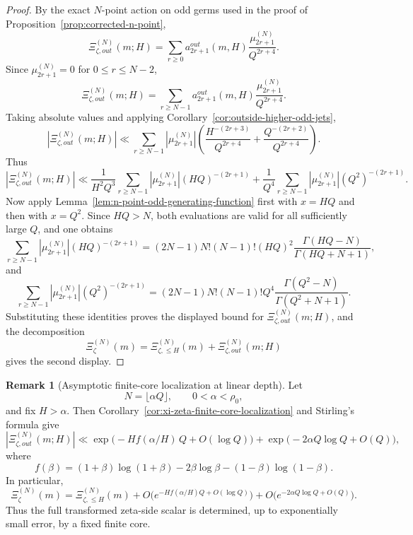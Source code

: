 \documentclass[11pt,a4paper]{amsart}
\def\out{out}%
\theoremstyle{plain}
\theoremstyle{definition}
\newtheorem{remark}[theorem]{Remark}
\newcommand{\out}{\mathrm{out}}
\begin{document}
\begin{proof}
By the exact $N$-point action on odd germs used in the proof of
Proposition~\ref{prop:corrected-n-point},
\[
\Xi_{\zeta,\out}^{(N)}(m;H)
=
\sum_{r\ge 0} a_{2r+1}^{\out}(m,H)\frac{\mu_{2r+1}^{(N)}}{Q^{2r+4}}.
\]
Since $\mu_{2r+1}^{(N)}=0$ for $0\le r\le N-2$,
\[
\Xi_{\zeta,\out}^{(N)}(m;H)
=
\sum_{r\ge N-1} a_{2r+1}^{\out}(m,H)\frac{\mu_{2r+1}^{(N)}}{Q^{2r+4}}.
\]
Taking absolute values and applying
Corollary~\ref{cor:outside-higher-odd-jets},
\[
|\Xi_{\zeta,\out}^{(N)}(m;H)|
\ll
\sum_{r\ge N-1}
|\mu_{2r+1}^{(N)}|
\left(
\frac{H^{-(2r+3)}}{Q^{2r+4}}
+
\frac{Q^{-(2r+2)}}{Q^{2r+4}}
\right).
\]
Thus
\[
|\Xi_{\zeta,\out}^{(N)}(m;H)|
\ll
\frac{1}{H^2Q^3}
\sum_{r\ge N-1}
|\mu_{2r+1}^{(N)}|(HQ)^{-(2r+1)}
+
\frac{1}{Q^4}
\sum_{r\ge N-1}
|\mu_{2r+1}^{(N)}|(Q^2)^{-(2r+1)}.
\]
Now apply Lemma~\ref{lem:n-point-odd-generating-function} first with
$x=HQ$ and then with $x=Q^2$. Since $HQ>N$, both evaluations are valid
for all sufficiently large $Q$, and one obtains
\[
\sum_{r\ge N-1}
|\mu_{2r+1}^{(N)}|(HQ)^{-(2r+1)}
=
(2N-1)N!(N-1)!(HQ)^2
\frac{\Gamma(HQ-N)}{\Gamma(HQ+N+1)},
\]
and
\[
\sum_{r\ge N-1}
|\mu_{2r+1}^{(N)}|(Q^2)^{-(2r+1)}
=
(2N-1)N!(N-1)!Q^4
\frac{\Gamma(Q^2-N)}{\Gamma(Q^2+N+1)}.
\]
Substituting these identities proves the displayed bound for
$\Xi_{\zeta,\out}^{(N)}(m;H)$, and the decomposition
\[
\Xi_\zeta^{(N)}(m)=\Xi_{\zeta,\le H}^{(N)}(m)+\Xi_{\zeta,\out}^{(N)}(m;H)
\]
gives the second display.
\end{proof}

\begin{remark}[Asymptotic finite-core localization at linear depth]
\label{rem:xi-zeta-finite-core-localization-asymptotic}
Let
\[
N=\lfloor \alpha Q\rfloor,
\qquad
0<\alpha<\rho_0,
\]
and fix $H>\alpha$. Then Corollary~\ref{cor:xi-zeta-finite-core-localization}
and Stirling's formula give
\[
|\Xi_{\zeta,\out}^{(N)}(m;H)|
\ll
\exp\!\bigl(-H f(\alpha/H)\,Q+O(\log Q)\bigr)
+
\exp\!\bigl(-2\alpha Q\log Q+O(Q)\bigr),
\]
where
\[
f(\beta)
=
(1+\beta)\log(1+\beta)-2\beta\log\beta-(1-\beta)\log(1-\beta).
\]
In particular,
\[
\Xi_\zeta^{(N)}(m)
=
\Xi_{\zeta,\le H}^{(N)}(m)
+
O\!\bigl(e^{-Hf(\alpha/H)Q+O(\log Q)}\bigr)
+
O\!\bigl(e^{-2\alpha Q\log Q+O(Q)}\bigr).
\]
Thus the full transformed zeta-side scalar is determined, up to exponentially
small error, by a fixed finite core.
\end{remark}
\end{document}
